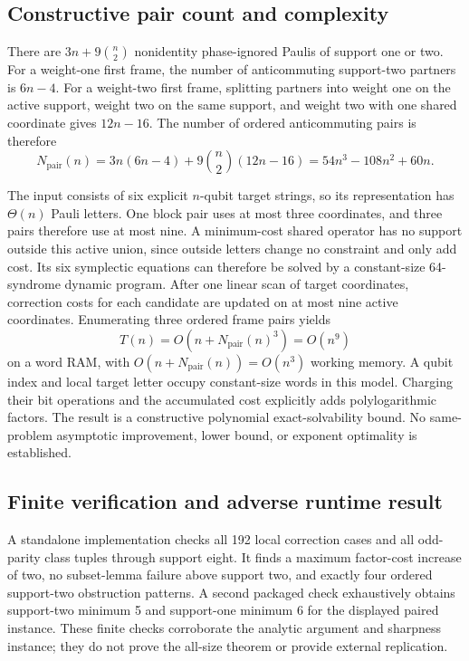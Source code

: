 \subsection{Constructive pair count and complexity}
There are $3n+9\binom n2$ nonidentity phase-ignored Paulis of support one or two. For a weight-one first frame, the number of anticommuting support-two partners is $6n-4$. For a weight-two first frame, splitting partners into weight one on the active support, weight two on the same support, and weight two with one shared coordinate gives $12n-16$. The number of ordered anticommuting pairs is therefore
\[
N_{\mathrm{pair}}(n)=3n(6n-4)+9\binom n2(12n-16)
     =54n^3-108n^2+60n.
\]

The input consists of six explicit $n$-qubit target strings, so its representation has $\Theta(n)$ Pauli letters. One block pair uses at most three coordinates, and three pairs therefore use at most nine. A minimum-cost shared operator has no support outside this active union, since outside letters change no constraint and only add cost. Its six symplectic equations can therefore be solved by a constant-size 64-syndrome dynamic program. After one linear scan of target coordinates, correction costs for each candidate are updated on at most nine active coordinates. Enumerating three ordered frame pairs yields
\[
T(n)=O\!\left(n+N_{\mathrm{pair}}(n)^3\right)=O(n^9)
\]
on a word RAM, with $O\!\left(n+N_{\mathrm{pair}}(n)\right)=O(n^3)$ working memory. A qubit index and local target letter occupy constant-size words in this model. Charging their bit operations and the accumulated cost explicitly adds polylogarithmic factors. The result is a constructive polynomial exact-solvability bound. No same-problem asymptotic improvement, lower bound, or exponent optimality is established.

\subsection{Finite verification and adverse runtime result}
A standalone implementation checks all 192 local correction cases and all odd-parity class tuples through support eight. It finds a maximum factor-cost increase of two, no subset-lemma failure above support two, and exactly four ordered support-two obstruction patterns. A second packaged check exhaustively obtains support-two minimum 5 and support-one minimum 6 for the displayed paired instance. These finite checks corroborate the analytic argument and sharpness instance; they do not prove the all-size theorem or provide external replication.


